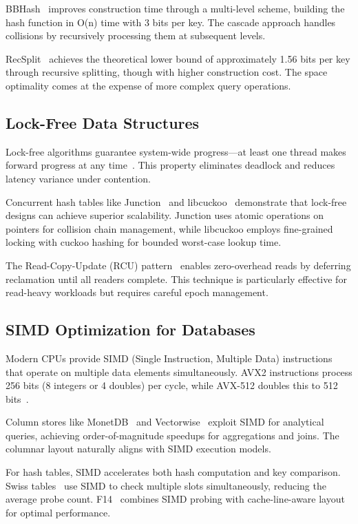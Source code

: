 \documentclass[10pt,conference]{IEEEtran}
\begin{document}
BBHash~\cite{bbhash} improves construction time through a multi-level scheme, building the hash function in O(n) time with 3 bits per key. The cascade approach handles collisions by recursively processing them at subsequent levels.

RecSplit~\cite{recsplit} achieves the theoretical lower bound of approximately 1.56 bits per key through recursive splitting, though with higher construction cost. The space optimality comes at the expense of more complex query operations.

\subsection{Lock-Free Data Structures}

Lock-free algorithms guarantee system-wide progress—at least one thread makes forward progress at any time~\cite{lock-free-survey}. This property eliminates deadlock and reduces latency variance under contention.

Concurrent hash tables like Junction~\cite{junction} and libcuckoo~\cite{libcuckoo} demonstrate that lock-free designs can achieve superior scalability. Junction uses atomic operations on pointers for collision chain management, while libcuckoo employs fine-grained locking with cuckoo hashing for bounded worst-case lookup time.

The Read-Copy-Update (RCU) pattern~\cite{rcu} enables zero-overhead reads by deferring reclamation until all readers complete. This technique is particularly effective for read-heavy workloads but requires careful epoch management.

\subsection{SIMD Optimization for Databases}

Modern CPUs provide SIMD (Single Instruction, Multiple Data) instructions that operate on multiple data elements simultaneously. AVX2 instructions process 256 bits (8 integers or 4 doubles) per cycle, while AVX-512 doubles this to 512 bits~\cite{simd-databases}.

Column stores like MonetDB~\cite{monetdb} and Vectorwise~\cite{vectorwise} exploit SIMD for analytical queries, achieving order-of-magnitude speedups for aggregations and joins. The columnar layout naturally aligns with SIMD execution models.

For hash tables, SIMD accelerates both hash computation and key comparison. Swiss tables~\cite{swisstables} use SIMD to check multiple slots simultaneously, reducing the average probe count. F14~\cite{f14} combines SIMD probing with cache-line-aware layout for optimal performance.
\end{document}
